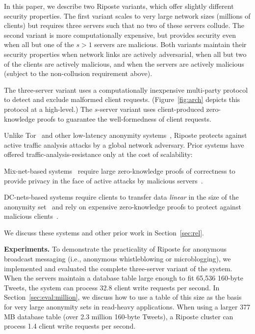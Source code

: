 \documentclass[10pt,twocolumn]{article}
\newcommand{\nicepara}[1]{\medskip\noindent\textbf{#1.}}
\newcommand{\name}{Riposte\xspace}
\begin{document}
In this paper, we describe two \name variants, which
offer slightly different security properties.
The first variant scales to very large network
sizes (millions of clients) but
requires three servers such that no two of these servers collude.
The second variant is more computationally expensive, 
but provides security
even when all but one of the $s>1$ servers are malicious.
Both variants maintain their security properties
when network links are actively adversarial, when 
all but two of the clients are actively malicious, and
when the servers are actively malicious 
(subject to the non-collusion requirement above).

The three-server variant uses a computationally inexpensive
multi-party protocol to detect and exclude malformed client
requests. (Figure~\ref{fig:arch} depicts this
protocol at a high-level.)
The $s$-server variant uses client-produced
zero-knowledge proofs to guarantee the well-formedness of 
client requests.

Unlike Tor~\cite{dingledine2004tor} and
other low-latency anonymity systems~\cite{goel2003herbivore,
  hsiao2012lap,
  leblond2013towards,
  reiter1998crowds},
\name protects against active traffic analysis attacks
by a global network adversary.
Prior systems have offered traffic-analysis-resistance 
only at the cost of scalability:
\begin{compactitem}
\item
Mix-net-based systems~\cite{chaum1981untraceable} require
large zero-knowledge proofs of correctness to provide privacy in
the face of active attacks by malicious servers~\cite{adida2007shuffle,bayer2012efficient,furukawa2004efficient,groth2010verifiable,neff2001verifiable}.
\item
DC-nets-based systems require clients to transfer data {\em linear} in the size
of the anonymity set~\cite{chaum1988dining,wolinsky2012dissent}
and rely on expensive zero-knowledge proofs
to protect against malicious clients~\cite{corrigangibbs2013proactively,golle2004dining}.
\end{compactitem}
We discuss these systems and other prior work in Section~\ref{sec:rel}.

\nicepara{Experiments}
To demonstrate the practicality of \name for 
anonymous broadcast messaging 
(i.e., anonymous whistleblowing or microblogging), we
implemented and evaluated the complete three-server variant of the system.
When the servers maintain a database table large enough to fit
65,536 160-byte Tweets, the system can process 32.8 client write
requests per second.
In Section~\ref{sec:eval:million}, we discuss how to use a table of this
size as the basis for very large anonymity 
sets in read-heavy applications.
When using a larger 377 MB database table (over 2.3 million 160-byte Tweets),
a \name cluster can process 1.4 client write requests per second.
\end{document}
